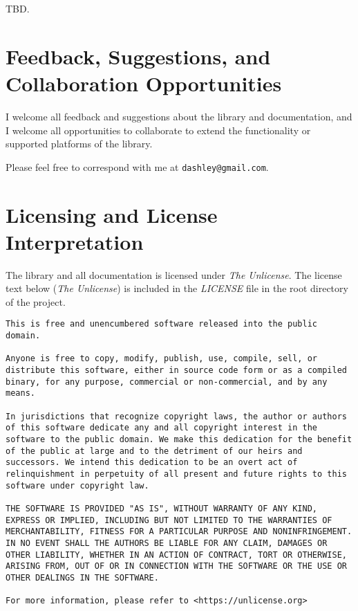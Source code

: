 TBD. 


\section{Feedback, Suggestions, and Collaboration Opportunities}
\label{ciov0:sfbk0}

I welcome all feedback and suggestions about the library and 
documentation, and I welcome all opportunities to collaborate to extend 
the functionality or supported platforms of the library.  

Please feel free to correspond with me at \texttt{dashley@\-gmail.com}.


\section{Licensing and License Interpretation}
\label{ciov0:slip0}

The \emph{\productbasenameshort{}} library and all 
documentation is licensed under
\emph{The Unlicense}.  The 
license text below (\emph{The Unlicense}) is included in the 
\emph{LICENSE} file in the root directory of the project.  

\begin{small}
\begin{verbatim}
This is free and unencumbered software released into the public domain.

Anyone is free to copy, modify, publish, use, compile, sell, or
distribute this software, either in source code form or as a compiled
binary, for any purpose, commercial or non-commercial, and by any
means.

In jurisdictions that recognize copyright laws, the author or authors
of this software dedicate any and all copyright interest in the
software to the public domain. We make this dedication for the benefit
of the public at large and to the detriment of our heirs and
successors. We intend this dedication to be an overt act of
relinquishment in perpetuity of all present and future rights to this
software under copyright law.

THE SOFTWARE IS PROVIDED "AS IS", WITHOUT WARRANTY OF ANY KIND,
EXPRESS OR IMPLIED, INCLUDING BUT NOT LIMITED TO THE WARRANTIES OF
MERCHANTABILITY, FITNESS FOR A PARTICULAR PURPOSE AND NONINFRINGEMENT.
IN NO EVENT SHALL THE AUTHORS BE LIABLE FOR ANY CLAIM, DAMAGES OR
OTHER LIABILITY, WHETHER IN AN ACTION OF CONTRACT, TORT OR OTHERWISE,
ARISING FROM, OUT OF OR IN CONNECTION WITH THE SOFTWARE OR THE USE OR
OTHER DEALINGS IN THE SOFTWARE.

For more information, please refer to <https://unlicense.org>
\end{verbatim}
\end{small}


